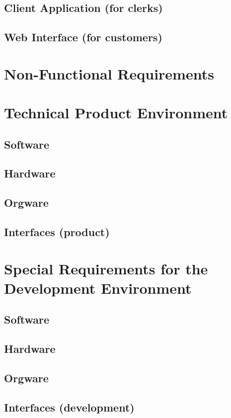 \documentclass[11pt,a4paper,oneside,svgnames]{report}
\begin{document}
\section{Client Application (for clerks)}
\section{Web Interface (for customers)}

\chapter{Non-Functional Requirements}
\chapter{Technical Product Environment}
\section{Software}
\section{Hardware}
\section{Orgware}
\section{Interfaces (product)}

\chapter{Special Requirements for the Development Environment}
\section{Software}
\section{Hardware}
\section{Orgware}
\section{Interfaces (development)}
\end{document}
